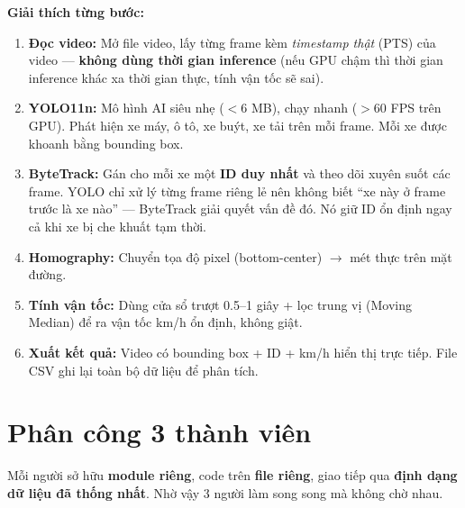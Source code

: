 \documentclass[11pt,a4paper]{article}
\begin{document}
\vspace{0.1cm}

\textbf{Giải thích từng bước:}
\begin{enumerate}
    \item \textbf{Đọc video:} Mở file video, lấy từng frame kèm \textit{timestamp thật} (PTS) của video --- \textbf{không dùng thời gian inference} (nếu GPU chậm thì thời gian inference khác xa thời gian thực, tính vận tốc sẽ sai).
    \item \textbf{YOLO11n:} Mô hình AI siêu nhẹ ($<$6 MB), chạy nhanh ($>$60 FPS trên GPU). Phát hiện xe máy, ô tô, xe buýt, xe tải trên mỗi frame. Mỗi xe được khoanh bằng bounding box.
    \item \textbf{ByteTrack:} Gán cho mỗi xe một \textbf{ID duy nhất} và theo dõi xuyên suốt các frame. YOLO chỉ xử lý từng frame riêng lẻ nên không biết ``xe này ở frame trước là xe nào'' --- ByteTrack giải quyết vấn đề đó. Nó giữ ID ổn định ngay cả khi xe bị che khuất tạm thời.
    \item \textbf{Homography:} Chuyển tọa độ pixel (bottom-center) $\rightarrow$ mét thực trên mặt đường.
    \item \textbf{Tính vận tốc:} Dùng cửa sổ trượt 0.5--1 giây + lọc trung vị (Moving Median) để ra vận tốc km/h ổn định, không giật.
    \item \textbf{Xuất kết quả:} Video có bounding box + ID + km/h hiển thị trực tiếp. File CSV ghi lại toàn bộ dữ liệu để phân tích.
\end{enumerate}

\section{Phân công 3 thành viên}

Mỗi người sở hữu \textbf{module riêng}, code trên \textbf{file riêng}, giao tiếp qua \textbf{định dạng dữ liệu đã thống nhất}. Nhờ vậy 3 người làm song song mà không chờ nhau.

\vspace{0.2cm}
\end{document}
